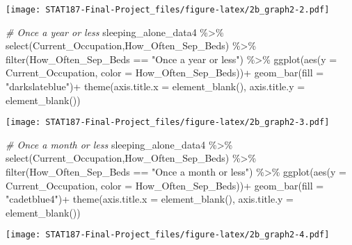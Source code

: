 \documentclass[
]{article}
\newenvironment{Shaded}{\begin{snugshade}}{\end{snugshade}}
\newcommand{\AttributeTok}[1]{\textcolor[rgb]{0.77,0.63,0.00}{#1}}
\newcommand{\CommentTok}[1]{\textcolor[rgb]{0.56,0.35,0.01}{\textit{#1}}}
\newcommand{\FunctionTok}[1]{\textcolor[rgb]{0.00,0.00,0.00}{#1}}
\newcommand{\NormalTok}[1]{#1}
\newcommand{\SpecialCharTok}[1]{\textcolor[rgb]{0.00,0.00,0.00}{#1}}
\newcommand{\StringTok}[1]{\textcolor[rgb]{0.31,0.60,0.02}{#1}}
\begin{document}
\texttt{[image: STAT187-Final-Project\_files/figure-latex/2b\_graph2-2.pdf]}

\begin{Shaded}
\begin{Highlighting}[]
\CommentTok{\# Once a year or less }
\NormalTok{sleeping\_alone\_data4 }\SpecialCharTok{\%\textgreater{}\%}
  \FunctionTok{select}\NormalTok{(Current\_Occupation,How\_Often\_Sep\_Beds) }\SpecialCharTok{\%\textgreater{}\%}
  \FunctionTok{filter}\NormalTok{(How\_Often\_Sep\_Beds }\SpecialCharTok{==} \StringTok{"Once a year or less"}\NormalTok{) }\SpecialCharTok{\%\textgreater{}\%}
  \FunctionTok{ggplot}\NormalTok{(}\FunctionTok{aes}\NormalTok{(}\AttributeTok{y =}\NormalTok{ Current\_Occupation,}
             \AttributeTok{color =}\NormalTok{ How\_Often\_Sep\_Beds))}\SpecialCharTok{+}
  \FunctionTok{geom\_bar}\NormalTok{(}\AttributeTok{fill =} \StringTok{"darkslateblue"}\NormalTok{)}\SpecialCharTok{+}
  \FunctionTok{theme}\NormalTok{(}\AttributeTok{axis.title.x =} \FunctionTok{element\_blank}\NormalTok{(),}
        \AttributeTok{axis.title.y =} \FunctionTok{element\_blank}\NormalTok{())}
\end{Highlighting}
\end{Shaded}

\texttt{[image: STAT187-Final-Project\_files/figure-latex/2b\_graph2-3.pdf]}

\begin{Shaded}
\begin{Highlighting}[]
\CommentTok{\# Once a month or less}
\NormalTok{sleeping\_alone\_data4 }\SpecialCharTok{\%\textgreater{}\%}
  \FunctionTok{select}\NormalTok{(Current\_Occupation,How\_Often\_Sep\_Beds) }\SpecialCharTok{\%\textgreater{}\%}
  \FunctionTok{filter}\NormalTok{(How\_Often\_Sep\_Beds }\SpecialCharTok{==} \StringTok{"Once a month or less"}\NormalTok{) }\SpecialCharTok{\%\textgreater{}\%}
  \FunctionTok{ggplot}\NormalTok{(}\FunctionTok{aes}\NormalTok{(}\AttributeTok{y =}\NormalTok{ Current\_Occupation,}
             \AttributeTok{color =}\NormalTok{ How\_Often\_Sep\_Beds))}\SpecialCharTok{+}
  \FunctionTok{geom\_bar}\NormalTok{(}\AttributeTok{fill =} \StringTok{"cadetblue4"}\NormalTok{)}\SpecialCharTok{+}
  \FunctionTok{theme}\NormalTok{(}\AttributeTok{axis.title.x =} \FunctionTok{element\_blank}\NormalTok{(),}
        \AttributeTok{axis.title.y =} \FunctionTok{element\_blank}\NormalTok{())}
\end{Highlighting}
\end{Shaded}

\texttt{[image: STAT187-Final-Project\_files/figure-latex/2b\_graph2-4.pdf]}
\end{document}
